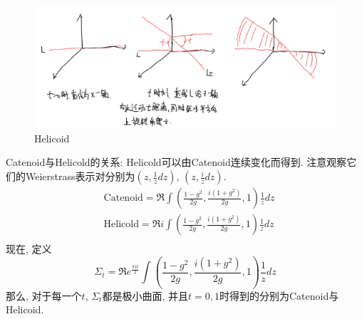 \begin{figure}[ht]
	\centering
	\includegraphics[scale=0.5]{images/helicoid.png}
	\caption{Helicoid}
	\label{variation_p}
\end{figure}
\par Catenoid与Helicold的关系: Helicold可以由Catenoid连续变化而得到. 注意观察它们的Weierstrass表示对分别为$(z,\frac{1}{z}dz)$, $(z,\frac{i}{z}dz)$.
\begin{align}
    &\text{Catenoid}= \Re \int (\frac{1-g^2}{2g}, \frac{i(1+g^2)}{2g},1)\frac{1}{z}dz \\
    &\text{Helicold}= \Re i \int (\frac{1-g^2}{2g}, \frac{i(1+g^2)}{2g},1)\frac{1}{z}dz \\
\end{align}
现在, 定义
\begin{equation}
    \Sigma_t= \Re e^{\frac{\pi it}{2}} \int (\frac{1-g^2}{2g}, \frac{i(1+g^2)}{2g},1)\frac{1}{z}dz 
\end{equation}
那么, 对于每一个$t$, $\Sigma_t$都是极小曲面, 并且$t=0,1$时得到的分别为Catenoid与Helicoid.